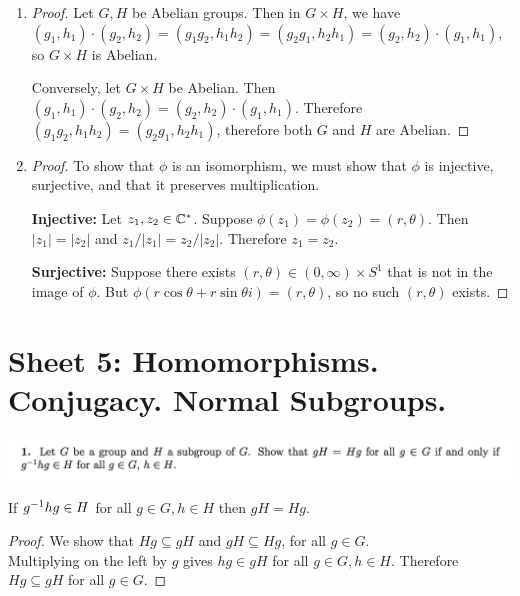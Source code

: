 \documentclass[12pt]{article}
\begin{document}
\begin{enumerate}
\item
  \begin{proof}
    Let $G, H$ be Abelian groups. Then in $G \times H$, we have
    $(g_1, h_1) \cdot (g_2, h_2) = (g_1g_2, h_1h_2) = (g_2g_1, h_2h_1) = (g_2, h_2) \cdot (g_1,
    h_1)$, so $G \times H$ is Abelian.

    Conversely, let $G \times H$ be Abelian. Then
    $(g_1, h_1) \cdot (g_2, h_2) = (g_2, h_2) \cdot (g_1, h_1)$. Therefore
    $(g_1g_2, h_1h_2) = (g_2g_1, h_2h_1)$, therefore both $G$ and $H$ are Abelian.
  \end{proof}
\item
  \begin{proof}
    To show that $\phi$ is an isomorphism, we must show that $\phi$ is injective, surjective, and
    that it preserves multiplication.

    \textbf{Injective:} Let $z_1, z_2 \in \mathbb{C}^*$. Suppose $\phi(z_1) = \phi(z_2) = (r,
    \theta)$. Then $|z_1| = |z_2|$ and $z_1/|z_1| = z_2/|z_2|$. Therefore $z_1 = z_2$.

    \textbf{Surjective:} Suppose there exists $(r, \theta) \in (0, \infty) \times S^1$ that is not
    in the image of $\phi$. But $\phi(r\cos\theta + r\sin\theta i) = (r, \theta)$, so no such
    $(r, \theta)$ exists.
  \end{proof}


\end{enumerate}


\newpage
\section{Sheet 5: Homomorphisms. Conjugacy. Normal Subgroups.}

\begin{mdframed}
\includegraphics[width=400pt]{img/abstract-algebra-oxford-M1-5-1.png}
\end{mdframed}

\begin{claim*}
  If $g^{-1}hg \in H$ for all $g \in G, h \in H$ then $gH = Hg$.
\end{claim*}

\begin{proof} We show that $Hg \subseteq gH$ and $gH \subseteq Hg$, for all $g \in G$.\\

Multiplying on the left by $g$ gives $hg \in gH$ for all $g \in G, h \in H$. Therefore $Hg \subseteq gH$ for all $g \in G$.
\end{proof}
\end{document}
